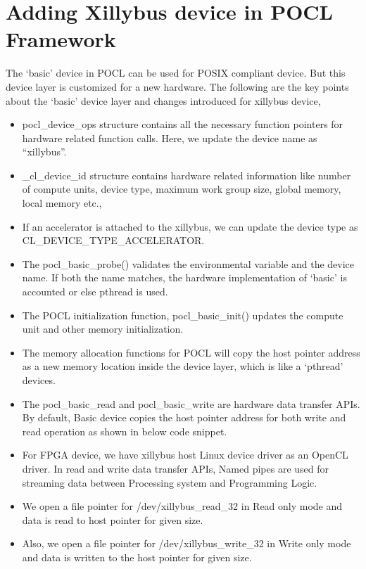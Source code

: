 \section{Adding Xillybus device in POCL Framework}
The ‘basic’ device in POCL can be used for POSIX compliant device. But this device layer is customized for a new hardware. The following are the key points about the ‘basic’ device layer and changes introduced for xillybus device,
\begin{itemize}
	\item pocl\_device\_ops structure contains all the necessary function pointers for hardware related function calls. Here, we update the device name as “xillybus”. 
	\item \_cl\_device\_id structure contains hardware related information like number of compute units, device type, maximum work group size, global memory, local memory etc.,
	\item If an accelerator is attached to the xillybus, we can update the device type as CL\_DEVICE\_TYPE\_ACCELERATOR.
	\item The pocl\_basic\_probe() validates the environmental variable and the device name. If both the name matches, the hardware implementation of ‘basic’ is accounted or else pthread is used.
	\item The POCL initialization function, pocl\_basic\_init() updates the compute unit and other memory initialization.
	\item The memory allocation functions for POCL will copy the host pointer address as a new memory location inside the device layer, which is like a ‘pthread’ devices.
	\item The pocl\_basic\_read and pocl\_basic\_write are hardware data transfer APIs. By default, Basic device copies the host pointer address for both write and read operation as shown in below code snippet.
	
	\item For FPGA device, we have xillybus host Linux device driver as an OpenCL driver. In read and write data transfer APIs, Named pipes are used for streaming data between Processing system and Programming Logic.
	\item We open a file pointer for /dev/xillybus\_read\_32 in Read only mode and data is read to host pointer for given size.
	
	\item Also, we open a file pointer for /dev/xillybus\_write\_32 in Write only mode and data is written to the host pointer for given size.
	
\end{itemize}

